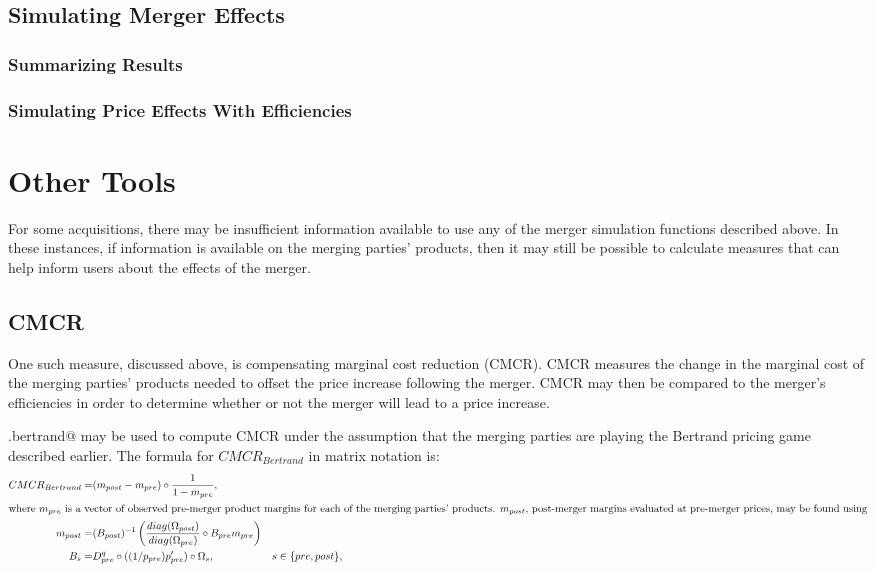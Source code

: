 \documentclass[11pt,numbers=noenddot,pointlessnumbers]{scrreprt}
\numberwithin{equation}{section}
\begin{document}
\section{Simulating Merger Effects}
\subsection{Summarizing Results}
\subsection{Simulating Price Effects With Efficiencies}

\chapter{Other Tools}
For some acquisitions, there may be insufficient information available
to use any of the merger simulation functions described above. In these
instances, if information is available on the merging parties'
products, then it may still be possible to calculate
measures that can help inform users about the effects of the merger.

\section{CMCR}
One such measure, discussed above, is compensating marginal cost
reduction (CMCR). CMCR measures the change in the marginal cost of the
merging parties' products needed to offset the price increase
following the merger. CMCR may then be compared to the merger's
efficiencies in order to determine whether or not the merger will lead
to a price increase.

\verb@cmcr.bertrand@ may be used to compute CMCR under the assumption
that the merging parties are playing the Bertrand pricing game
described earlier. The formula for $CMCR_{Bertrand}$ in matrix notation is:
\begin{align*}
  CMCR_{Bertrand}=&(m_{post}-m_{pre})\circ\frac{1}{1-m_{pre}},&\\
  \intertext{where $m_{pre}$ is a vector of observed pre-merger product
    margins for each of the merging parties' products. $m_{post}$,
    post-merger margins evaluated at pre-merger prices, may be
    found using}
  m_{post}=&(B_{post})^{-1}\left(\frac{diag(\Omega_{post})}{diag(\Omega_{pre})}\circ
  B_{pre}m_{pre}\right)&\\
  B_s=&D^q_{pre}\circ((1/p_{pre})p_{pre}')\circ\Omega_s,& s \in \{pre,post\},
\end{align*}
\end{document}
